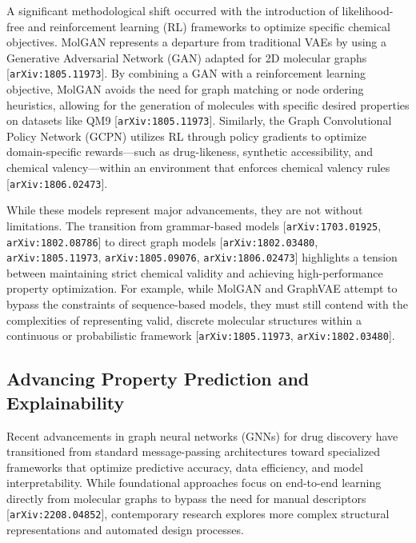 \documentclass[11pt]{article}
\begin{document}
A significant methodological shift occurred with the introduction of likelihood-free and reinforcement learning (RL) frameworks to optimize specific chemical objectives. MolGAN represents a departure from traditional VAEs by using a Generative Adversarial Network (GAN) adapted for 2D molecular graphs [\texttt{arXiv:1805.11973}]. By combining a GAN with a reinforcement learning objective, MolGAN avoids the need for graph matching or node ordering heuristics, allowing for the generation of molecules with specific desired properties on datasets like QM9 [\texttt{arXiv:1805.11973}]. Similarly, the Graph Convolutional Policy Network (GCPN) utilizes RL through policy gradients to optimize domain-specific rewards—such as drug-likeness, synthetic accessibility, and chemical valency—within an environment that enforces chemical valency rules [\texttt{arXiv:1806.02473}].

While these models represent major advancements, they are not without limitations. The transition from grammar-based models [\texttt{arXiv:1703.01925}, \texttt{arXiv:1802.08786}] to direct graph models [\texttt{arXiv:1802.03480}, \texttt{arXiv:1805.11973}, \texttt{arXiv:1805.09076}, \texttt{arXiv:1806.02473}] highlights a tension between maintaining strict chemical validity and achieving high-performance property optimization. For example, while MolGAN and GraphVAE attempt to bypass the constraints of sequence-based models, they must still contend with the complexities of representing valid, discrete molecular structures within a continuous or probabilistic framework [\texttt{arXiv:1805.11973}, \texttt{arXiv:1802.03480}].

\subsection{Advancing Property Prediction and Explainability}

Recent advancements in graph neural networks (GNNs) for drug discovery have transitioned from standard message-passing architectures toward specialized frameworks that optimize predictive accuracy, data efficiency, and model interpretability. While foundational approaches focus on end-to-end learning directly from molecular graphs to bypass the need for manual descriptors [\texttt{arXiv:2208.04852}], contemporary research explores more complex structural representations and automated design processes.
\end{document}
